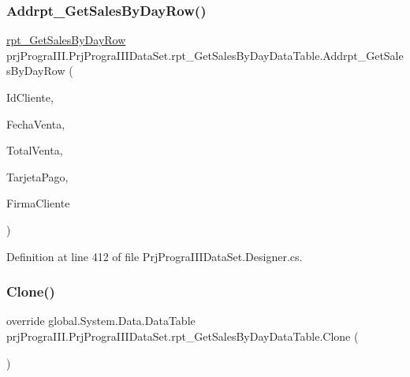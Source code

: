 \subsubsection{\texorpdfstring{Addrpt\+\_\+\+Get\+Sales\+By\+Day\+Row()}{Addrpt\_GetSalesByDayRow()}\hspace{0.1cm}{\footnotesize\ttfamily [2/2]}}
{\footnotesize\ttfamily \hyperlink{classprj_progra_i_i_i_1_1_prj_progra_i_i_i_data_set_1_1rpt___get_sales_by_day_row}{rpt\+\_\+\+Get\+Sales\+By\+Day\+Row} prj\+Progra\+I\+I\+I.\+Prj\+Progra\+I\+I\+I\+Data\+Set.\+rpt\+\_\+\+Get\+Sales\+By\+Day\+Data\+Table.\+Addrpt\+\_\+\+Get\+Sales\+By\+Day\+Row (\begin{DoxyParamCaption}\item[{int}]{Id\+Cliente,  }\item[{System.\+Date\+Time}]{Fecha\+Venta,  }\item[{int}]{Total\+Venta,  }\item[{string}]{Tarjeta\+Pago,  }\item[{byte \mbox{[}$\,$\mbox{]}}]{Firma\+Cliente }\end{DoxyParamCaption})}



Definition at line 412 of file Prj\+Progra\+I\+I\+I\+Data\+Set.\+Designer.\+cs.

\hypertarget{classprj_progra_i_i_i_1_1_prj_progra_i_i_i_data_set_1_1rpt___get_sales_by_day_data_table_aeb9181a316dd54a548607a9cd8fbc16c}{}\label{classprj_progra_i_i_i_1_1_prj_progra_i_i_i_data_set_1_1rpt___get_sales_by_day_data_table_aeb9181a316dd54a548607a9cd8fbc16c} 
\subsubsection{\texorpdfstring{Clone()}{Clone()}}
{\footnotesize\ttfamily override global.\+System.\+Data.\+Data\+Table prj\+Progra\+I\+I\+I.\+Prj\+Progra\+I\+I\+I\+Data\+Set.\+rpt\+\_\+\+Get\+Sales\+By\+Day\+Data\+Table.\+Clone (\begin{DoxyParamCaption}{ }\end{DoxyParamCaption})}



